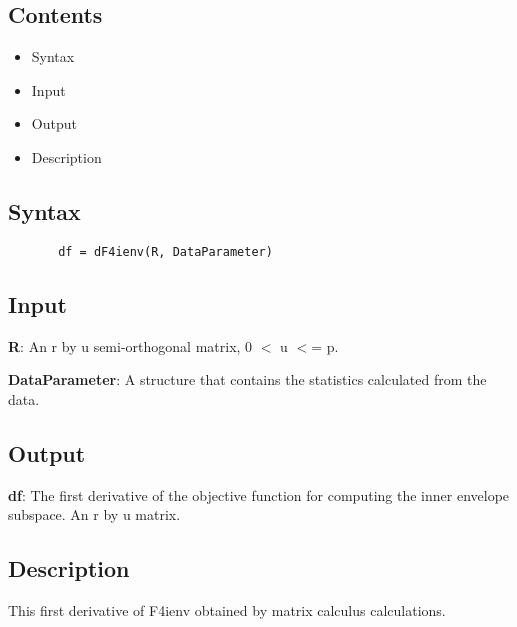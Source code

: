 \documentclass[a4paper,11pt,openany]{memoir}
\begin{document}
\subsection*{Contents}

\begin{itemize}
\setlength{\itemsep}{-1ex}
   \item Syntax
   \item Input
   \item Output
   \item Description
\end{itemize}


\subsection*{Syntax}


\begin{verbatim}       df = dF4ienv(R, DataParameter)\end{verbatim}
    

\subsection*{Input}

\begin{par}
\textbf{R}: An r by u semi-orthogonal matrix, 0 \ensuremath{<} u \ensuremath{<}= p.
\end{par} \vspace{1em}
\begin{par}
\textbf{DataParameter}: A structure that contains the statistics calculated from the data.
\end{par} \vspace{1em}


\subsection*{Output}

\begin{par}
\textbf{df}: The first derivative of the objective function for computing the inner envelope subspace.  An r by u matrix.
\end{par} \vspace{1em}


\subsection*{Description}

\begin{par}
This first derivative of F4ienv obtained by matrix calculus calculations.
\end{par} \vspace{1em}
\end{document}

